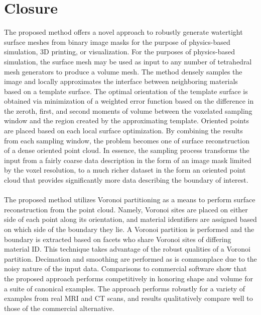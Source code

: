 \section{Closure}

The proposed method offers a novel approach to robustly generate watertight surface meshes from binary image masks for the purpose of physics-based simulation, 3D printing, or visualization. For the purposes of physics-based simulation, the surface mesh may be used as input to any number of tetrahedral mesh generators to produce a volume mesh. The method densely samples the image and locally approximates the interface between neighboring materials based on a template surface. The optimal orientation of the template surface is obtained via minimization of a weighted error function based on the difference in the zeroth, first, and second moments of volume between the voxelated sampling window and the region created by the approximating template. Oriented points are placed based on each local surface optimization. By combining the results from each sampling window, the problem becomes one of surface reconstruction of a dense oriented point cloud. In essence, the sampling process transforms the input from a fairly coarse data description in the form of an image mask limited by the voxel resolution, to a much richer dataset in the form an oriented point cloud that provides significantly more data describing the boundary of interest. \\ \\
%
The proposed method utilizes Voronoi partitioning as a means to perform surface reconstruction from the point cloud. Namely, Voronoi sites are placed on either side of each point along its orientation, and material identifiers are assigned based on which side of the boundary they lie. A Voronoi partition is performed and the boundary is extracted based on facets who share Voronoi sites of differing material ID. This technique takes advantage of the robust qualities of a Voronoi partition. Decimation and smoothing are performed as is commonplace due to the noisy nature of the input data. Comparisons to commercial software show that the proposed approach performs competitively in honoring shape and volume for a suite of canonical examples. The approach performs robustly for a variety of examples from real MRI and CT scans, and results qualitatively compare well to those of the commercial alternative. \\ \\
%
